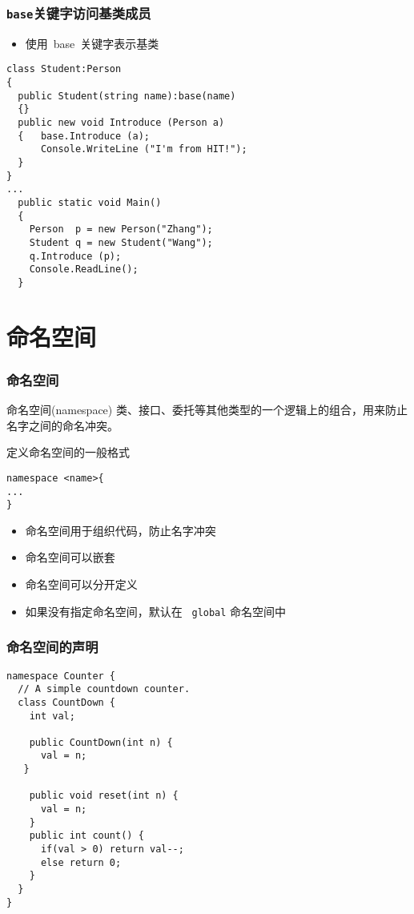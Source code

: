 \begin{frame}[fragile]
\frametitle{\texttt{base}关键字访问基类成员}
\begin{itemize}
\item 使用~base~关键字表示基类
\end{itemize}
\begin{lstlisting}
class Student:Person
{
  public Student(string name):base(name)
  {}
  public new void Introduce (Person a)
  {   base.Introduce (a);
      Console.WriteLine ("I'm from HIT!");
  }
}
...
  public static void Main()
  {
    Person  p = new Person("Zhang");
    Student q = new Student("Wang");
    q.Introduce (p);
    Console.ReadLine();
  }
\end{lstlisting}
\end{frame}

\section{命名空间}

\begin{frame}[fragile]
\frametitle{命名空间}
\begin{block}{命名空间(namespace)}
  \CJKindent 类、接口、委托等其他类型的一个逻辑上的组合，用来防止名字之间的命名冲突。
\end{block}
\pause
定义命名空间的一般格式
\begin{lstlisting}
namespace <name>{
...
}
\end{lstlisting}
\begin{itemize}
\item 命名空间用于组织代码，防止名字冲突
\item 命名空间可以嵌套
\item 命名空间可以分开定义
\item 如果没有指定命名空间，默认在 ~\texttt{global} 命名空间中
\end{itemize}
\end{frame}

\begin{frame}[fragile]
\frametitle{命名空间的声明}
\begin{lstlisting}
namespace Counter {
  // A simple countdown counter.
  class CountDown {
    int val;

    public CountDown(int n) {
      val = n;
   }

    public void reset(int n) {
      val = n;
    }
    public int count() {
      if(val > 0) return val--;
      else return 0;
    }
  }
}
\end{lstlisting}
\end{frame}

